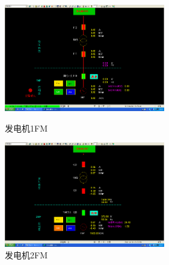 \documentclass[a4paper]{ctexrep}
\begin{document}
                    \begin{figure}[htbp]
                        \centering
                        \begin{minipage}[t]{0.48\textwidth}
                            \centering
                            \includegraphics[width=7cm]{7.png}
                            \caption{发电机1FM}
                        \end{minipage} 
                        \begin{minipage}[t]{0.48\textwidth}
                            \centering
                            \includegraphics[width=7cm]{8.png}
                            \caption{发电机2FM}
                        \end{minipage}
                    \end{figure}
\end{document}
